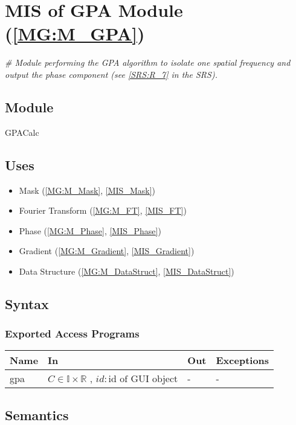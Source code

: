\documentclass[12pt, titlepage]{article}
\begin{document}
\section{MIS of GPA Module (\texorpdfstring{\cref{MG:M_GPA}}))} \label{MIS_GPA}

\noindent\textit{{\#} Module performing the GPA algorithm to isolate one spatial 
frequency and output the phase component (see \cref{SRS:R_7} in the SRS).}

\subsection{Module}
GPACalc
\subsection{Uses}
\begin{itemize}
\item Mask (\cref{MG:M_Mask}, \cref{MIS_Mask})
\item Fourier Transform (\cref{MG:M_FT}, \cref{MIS_FT})
\item Phase (\cref{MG:M_Phase}, \cref{MIS_Phase})
\item Gradient (\cref{MG:M_Gradient}, \cref{MIS_Gradient})
\item Data Structure (\cref{MG:M_DataStruct}, \cref{MIS_DataStruct})
\end{itemize}

\subsection{Syntax}

\subsubsection{Exported Access Programs}

\begin{center}
\begin{tabular}{p{2cm} p{4cm} p{4cm} p{3cm}}
\hline
\textbf{Name} & \textbf{In} & \textbf{Out} & \textbf{Exceptions} \\
\hline
gpa & $C \in \mathbb{I}\times\mathbb{R}$ , $id : \text{id of GUI object}$ & - 
& - \\
\hline
\end{tabular}
\end{center}

\subsection{Semantics}
\end{document}
